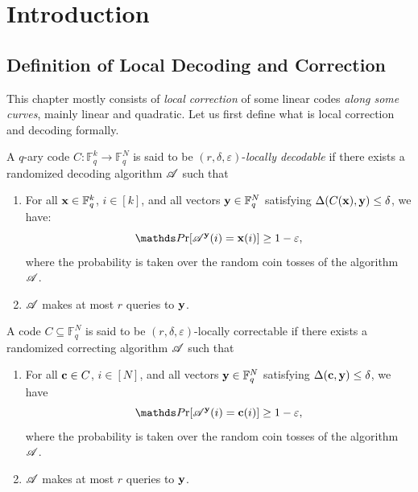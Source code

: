\chapter{Introduction}\label{ldc}
\label{ch:intro}

\section{Definition of Local Decoding and Correction}

This chapter mostly consists of \emph{local correction} of some linear codes \emph{along some curves}, mainly linear and quadratic. Let us first define what is local correction and decoding formally.

\begin{definition}%
	A $q$-ary code $C : \mathbb{F}_q^k \to \mathbb{F}_q^N$ is said to be
	$(r,\delta,\varepsilon)$-\emph{locally decodable} if there exists a randomized
	decoding algorithm $\mathscr{A}$ such that
	
	\begin{enumerate}
		\item For all $\mathbf{x} \in \mathbb{F}_q^k$, $i \in [k]$, and all vectors
		$\mathbf{y} \in \mathbb{F}_q^N$ satisfying $\Delta(C(\mathbf{x}),\mathbf{y}) \le \delta$, we have:
		\[
		\Pr[\sca^{\bfy}(i)=\bfx(i)] \ge 1-\varepsilon,
		\]
		where the probability is taken over the random coin tosses of the
		algorithm $\mathscr{A}$.
		
		\item $\mathscr{A}$ makes at most $r$ queries to $\mathbf{y}$.
	\end{enumerate}
\end{definition} 

\begin{definition}%
	A code $C \subseteq \mathbb{F}_q^N$ is said to be
	$(r,\delta,\varepsilon)$-locally correctable if there exists a randomized
	correcting algorithm $\mathscr{A}$ such that
	
	\begin{enumerate}
		\item For all $\mathbf{c} \in C$, $i \in [N]$, and all vectors
		$\mathbf{y} \in \mathbb{F}_q^N$ satisfying $\Delta(\mathbf{c},\mathbf{y}) \le \delta$, we have
		\[
		\Pr[\sca^{\bfy}(i)=\bfc(i)] \ge 1-\varepsilon,
		\]
		where the probability is taken over the random coin tosses of the
		algorithm $\mathscr{A}$.
		
		\item $\mathscr{A}$ makes at most $r$ queries to $\mathbf{y}$.
	\end{enumerate}
\end{definition}

